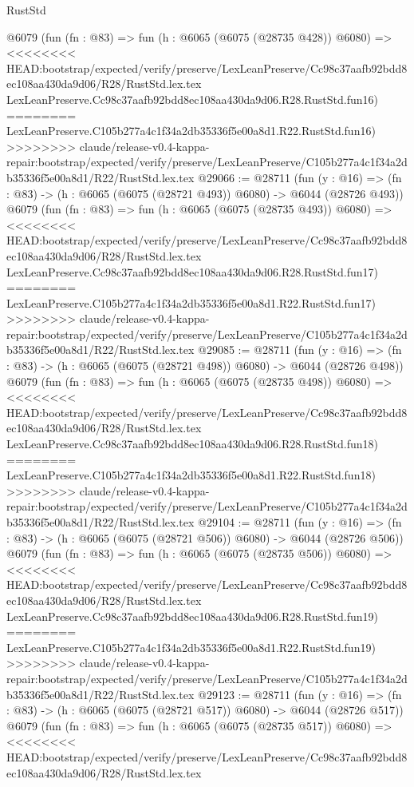 \begin{lexlean}{RustStd}
\begin{coremodule}
{\begin{coremodule}
{{{{{{{{{{{{{{{{{{{{{{{{{{    @6079
    (fun (fn : @83) =>
    fun (h : @6065 (@6075 (@28735 @428)) @6080) =>
<<<<<<<< HEAD:bootstrap/expected/verify/preserve/LexLeanPreserve/Cc98c37aafb92bdd8ec108aa430da9d06/R28/RustStd.lex.tex
    LexLeanPreserve.Cc98c37aafb92bdd8ec108aa430da9d06.R28.RustStd.fun16)
========
    LexLeanPreserve.C105b277a4c1f34a2db35336f5e00a8d1.R22.RustStd.fun16)
>>>>>>>> claude/release-v0.4-kappa-repair:bootstrap/expected/verify/preserve/LexLeanPreserve/C105b277a4c1f34a2db35336f5e00a8d1/R22/RustStd.lex.tex
@29066 := @28711
    (fun (y : @16) => (fn : @83) -> (h : @6065 (@6075 (@28721 @493)) @6080) -> @6044 (@28726 @493))
    @6079
    (fun (fn : @83) =>
    fun (h : @6065 (@6075 (@28735 @493)) @6080) =>
<<<<<<<< HEAD:bootstrap/expected/verify/preserve/LexLeanPreserve/Cc98c37aafb92bdd8ec108aa430da9d06/R28/RustStd.lex.tex
    LexLeanPreserve.Cc98c37aafb92bdd8ec108aa430da9d06.R28.RustStd.fun17)
========
    LexLeanPreserve.C105b277a4c1f34a2db35336f5e00a8d1.R22.RustStd.fun17)
>>>>>>>> claude/release-v0.4-kappa-repair:bootstrap/expected/verify/preserve/LexLeanPreserve/C105b277a4c1f34a2db35336f5e00a8d1/R22/RustStd.lex.tex
@29085 := @28711
    (fun (y : @16) => (fn : @83) -> (h : @6065 (@6075 (@28721 @498)) @6080) -> @6044 (@28726 @498))
    @6079
    (fun (fn : @83) =>
    fun (h : @6065 (@6075 (@28735 @498)) @6080) =>
<<<<<<<< HEAD:bootstrap/expected/verify/preserve/LexLeanPreserve/Cc98c37aafb92bdd8ec108aa430da9d06/R28/RustStd.lex.tex
    LexLeanPreserve.Cc98c37aafb92bdd8ec108aa430da9d06.R28.RustStd.fun18)
========
    LexLeanPreserve.C105b277a4c1f34a2db35336f5e00a8d1.R22.RustStd.fun18)
>>>>>>>> claude/release-v0.4-kappa-repair:bootstrap/expected/verify/preserve/LexLeanPreserve/C105b277a4c1f34a2db35336f5e00a8d1/R22/RustStd.lex.tex
@29104 := @28711
    (fun (y : @16) => (fn : @83) -> (h : @6065 (@6075 (@28721 @506)) @6080) -> @6044 (@28726 @506))
    @6079
    (fun (fn : @83) =>
    fun (h : @6065 (@6075 (@28735 @506)) @6080) =>
<<<<<<<< HEAD:bootstrap/expected/verify/preserve/LexLeanPreserve/Cc98c37aafb92bdd8ec108aa430da9d06/R28/RustStd.lex.tex
    LexLeanPreserve.Cc98c37aafb92bdd8ec108aa430da9d06.R28.RustStd.fun19)
========
    LexLeanPreserve.C105b277a4c1f34a2db35336f5e00a8d1.R22.RustStd.fun19)
>>>>>>>> claude/release-v0.4-kappa-repair:bootstrap/expected/verify/preserve/LexLeanPreserve/C105b277a4c1f34a2db35336f5e00a8d1/R22/RustStd.lex.tex
@29123 := @28711
    (fun (y : @16) => (fn : @83) -> (h : @6065 (@6075 (@28721 @517)) @6080) -> @6044 (@28726 @517))
    @6079
    (fun (fn : @83) =>
    fun (h : @6065 (@6075 (@28735 @517)) @6080) =>
<<<<<<<< HEAD:bootstrap/expected/verify/preserve/LexLeanPreserve/Cc98c37aafb92bdd8ec108aa430da9d06/R28/RustStd.lex.tex
}}}}}}}}}}}}}}}}}}}}}}}}}}
\end{coremodule}}
\end{coremodule}
\end{lexlean}

